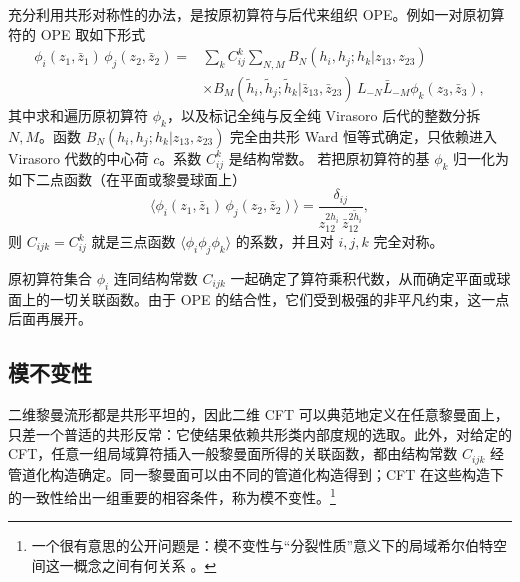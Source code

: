 充分利用共形对称性的办法，是按原初算符与后代来组织 OPE。例如一对原初算符的 OPE 取如下形式
\begin{equation}
  \label{eq:2-23}
  \begin{aligned}
  \phi_i(z_1,\bar z_1)\,\phi_j(z_2,\bar z_2)
  ={}& \sum_k C_{ij}^{k}\sum_{N,M}
  B_N(h_i,h_j;h_k|z_{13},z_{23})\\
  &\times B_M(\tilde h_i,\tilde h_j;\tilde h_k|\bar z_{13},\bar z_{23})\,
  L_{-N}\bar L_{-M}\phi_k(z_3,\bar z_3),
  \end{aligned}
\end{equation}
其中求和遍历原初算符 $\phi_k$，以及标记全纯与反全纯 Virasoro 后代的整数分拆 $N,M$。函数 $B_N(h_i,h_j;h_k|z_{13},z_{23})$ 完全由共形 Ward 恒等式确定，只依赖进入 Virasoro 代数的中心荷 $c$。系数 $C_{ij}^{k}$ 是结构常数。
若把原初算符的基 $\phi_k$ 归一化为如下二点函数（在平面或黎曼球面上）
\begin{equation}
  \label{eq:2-24}
  \langle\phi_i(z_1,\bar z_1)\,\phi_j(z_2,\bar z_2)\rangle
  = \frac{\delta_{ij}}{z_{12}^{2h_i}\,\bar z_{12}^{2\tilde h_i}},
\end{equation}
则 $C_{ijk}=C_{ij}^{k}$ 就是三点函数 $\langle\phi_i\phi_j\phi_k\rangle$ 的系数，并且对 $i,j,k$ 完全对称。

原初算符集合 $\phi_i$ 连同结构常数 $C_{ijk}$ 一起确定了算符乘积代数，从而确定平面或球面上的一切关联函数。由于 OPE 的结合性，它们受到极强的非平凡约束，这一点后面再展开。

\subsection{模不变性}

二维黎曼流形都是共形平坦的，因此二维 CFT 可以典范地定义在任意黎曼面上，只差一个普适的共形反常：它使结果依赖共形类内部度规的选取。此外，对给定的 CFT，任意一组局域算符插入一般黎曼面所得的关联函数，都由结构常数 $C_{ijk}$ 经管道化构造确定。同一黎曼面可以由不同的管道化构造得到；CFT 在这些构造下的一致性给出一组重要的相容条件，称为模不变性。\footnote{一个很有意思的公开问题是：模不变性与“分裂性质”意义下的局域希尔伯特空间这一概念之间有何关系 \cite{r6,r7}。}

